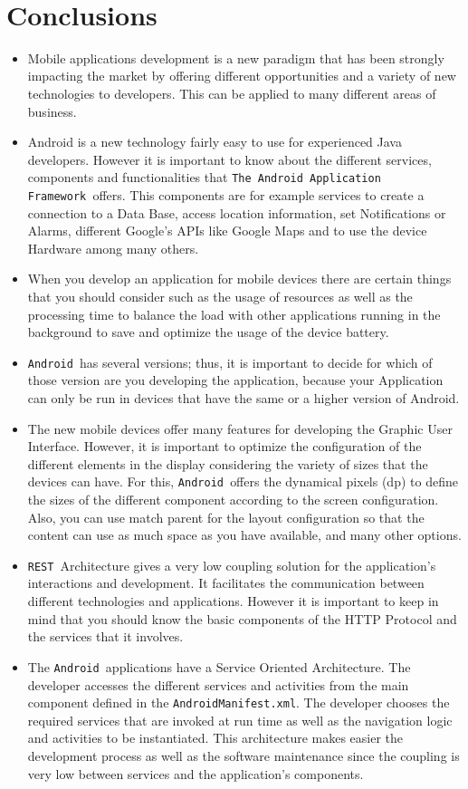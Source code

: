 \documentclass[journal]{IEEEtran}
\newcommand{\andrs}{\texttt{Android~}}
\newcommand{\rest}{\texttt{REST~}}
\newcommand{\amnf}{\texttt{AndroidManifest.xml}}
\newcommand{\apf}{\texttt{The Android Application Framework~}}
\begin{document}
\


\section{Conclusions}
\begin{itemize}
  \item Mobile applications development is a new paradigm that has been strongly impacting the market by offering different 
opportunities and a variety of new technologies to developers. This can be applied to many different areas of
business.
  \item Android is a new technology fairly easy to use for experienced Java developers. However it is important to know about the 
different services, components and functionalities that \apf offers. This components are for example services to create
a connection to a Data Base, access location information, set Notifications or Alarms, different Google's APIs like Google Maps
and to use the device Hardware among many others.  
  \item When you develop an application for mobile  devices there are certain things that you should consider such as the usage of 
resources as well as the processing time to balance the load with other applications running in the background to save and optimize the usage 
of the device battery.
  \item \andrs has several versions; thus, it is important to decide for which of those version are you developing the application,
because your Application can only be run in devices that have the same or a higher version of Android.
  \item The new mobile devices offer many features for developing the Graphic User Interface. However, it is important to optimize
 the configuration of the different elements in the display considering the variety of sizes that the devices can have. For 
this, \andrs offers the dynamical pixels (dp) to define the sizes of the different component according to the screen configuration.
Also, you can use match parent for the layout configuration so that the content can use as much space as you have available, and many
other options. 

\item \rest Architecture gives a very low coupling solution for the application's interactions and development.
It facilitates the communication  between different technologies and applications. However it is important to keep in mind that
you should know the basic components of the HTTP Protocol and the services that it involves.

\item The \andrs applications have a Service Oriented Architecture. The developer accesses the different services and activities 
from the main component defined in the \amnf. The developer chooses the required services that are invoked at run time as well as
the navigation logic and activities to be instantiated. This architecture makes easier the development process as well as the 
software maintenance since the coupling is very low between services and the application's components.

\end{itemize}
\end{document}
